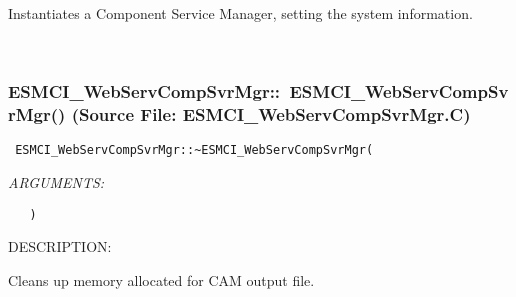       Instantiates a Component Service Manager, setting the system information.
   
 
\mbox{}\hrulefill\
 
\subsubsection{ESMCI\_WebServCompSvrMgr::~ESMCI\_WebServCompSvrMgr() (Source File: ESMCI\_WebServCompSvrMgr.C)}


  
\begin{verbatim} ESMCI_WebServCompSvrMgr::~ESMCI_WebServCompSvrMgr(\end{verbatim}{\em ARGUMENTS:}
\begin{verbatim}   )\end{verbatim}
{\sf DESCRIPTION:\\ }


      Cleans up memory allocated for CAM output file.
  
\setlength{\parskip}{\oldparskip}
\setlength{\parindent}{\oldparindent}
\setlength{\baselineskip}{\oldbaselineskip}
